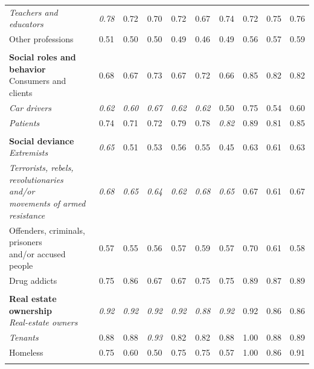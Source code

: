 \begin{table}[htb]
\begin{threeparttable}
\begin{tabular}{l c c c c c c c c c}
\textit{Teachers and educators} & \textit{0.78} & 0.72 & 0.70 & 0.72 & 0.67 & 0.74 & 0.72 & 0.75 & 0.76 \\
Other professions & 0.51 & 0.50 & 0.50 & 0.49 & 0.46 & 0.49 & 0.56 & 0.57 & 0.59 \\
\rule{0pt}{5pt} &  &  &  &  &  &  &  &  &  \\
\shortstack[l]{\textbf{Social roles and behavior}\\[3pt]Consumers and clients} & 0.68 & 0.67 & 0.73 & 0.67 & 0.72 & 0.66 & 0.85 & 0.82 & 0.82 \\
\textit{Car drivers} & \textit{0.62} & \textit{0.60} & \textit{0.67} & \textit{0.62} & \textit{0.62} & 0.50 & 0.75 & 0.54 & 0.60 \\
\textit{Patients} & 0.74 & 0.71 & 0.72 & 0.79 & 0.78 & \textit{0.82} & 0.89 & 0.81 & 0.85 \\
\rule{0pt}{5pt} &  &  &  &  &  &  &  &  &  \\
\shortstack[l]{\textbf{Social deviance}\\[3pt]\textit{Extremists}} & \textit{0.65} & 0.51 & 0.53 & 0.56 & 0.55 & 0.45 & 0.63 & 0.61 & 0.63 \\
\shortstack[l]{\textit{Terrorists, rebels,}\\[-3pt]\textit{revolutionaries and/or}\\[-3pt]\textit{movements of armed resistance}} & \textit{0.68} & \textit{0.65} & \textit{0.64} & \textit{0.62} & \textit{0.68} & \textit{0.65} & 0.67 & 0.61 & 0.67 \\
\shortstack[l]{Offenders, criminals, prisoners\\[-3pt]and/or accused people} & 0.57 & 0.55 & 0.56 & 0.57 & 0.59 & 0.57 & 0.70 & 0.61 & 0.58 \\
Drug addicts & 0.75 & 0.86 & 0.67 & 0.67 & 0.75 & 0.75 & 0.89 & 0.87 & 0.89 \\
\rule{0pt}{5pt} &  &  &  &  &  &  &  &  &  \\
\shortstack[l]{\textbf{Real estate ownership}\\[3pt]\textit{Real-estate owners}} & \textit{0.92} & \textit{0.92} & \textit{0.92} & \textit{0.92} & \textit{0.88} & \textit{0.92} & 0.92 & 0.86 & 0.86 \\
\textit{Tenants} & 0.88 & 0.88 & \textit{0.93} & 0.82 & 0.82 & 0.88 & 1.00 & 0.88 & 0.89 \\
Homeless & 0.75 & 0.60 & 0.50 & 0.75 & 0.75 & 0.57 & 1.00 & 0.86 & 0.91 \\
\rule{0pt}{5pt} &  &  &  &  &  &  &  &  &  \\

\end{tabular}
\end{threeparttable}
\end{table}
